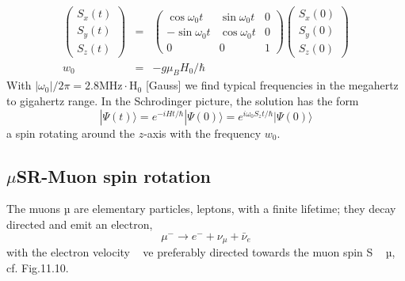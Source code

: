 \begin{equation}
    \begin{array}{ccl}
       \left(\begin{array}{c}{S_{x}(t)} \\ {S_{y}(t)} \\ {S_{z}(t)}\end{array}\right) &=& \left(\begin{array}{ccc}{\cos \omega_{0} t} & {\sin \omega_{0} t} & {0} \\ {-\sin \omega_{0} t} & {\cos \omega_{0} t} & {0} \\ {0} & {0} & {1}\end{array}\right)\left(\begin{array}{c}{S_{x}(0)} \\ {S_{y}(0)} \\ {S_{z}(0)}\end{array}\right)\\
        w_0 &=& -g\mu_BH_0/\hbar
    \end{array}
\end{equation}
With $\left|\omega_{0}\right| / 2 \pi=2.8 \mathrm{MHz} \cdot \mathrm{H}_{0}$ [Gauss] we find typical frequencies in the megahertz to gigahertz range. In the Schrodinger picture, the solution has the form
\begin{equation}
    |\Psi(t)\rangle= e^{-i H t / \hbar}|\Psi(0)\rangle= e^{i \omega_{0} S_{z} t / \hbar}|\Psi(0)\rangle
    \end{equation}
a spin rotating around the $z$-axis with the frequency $w_0$.
\subsection{$\mu$SR-Muon spin rotation}
The muons µ are elementary particles, leptons, with a finite lifetime; they decay directed and emit an electron,
\begin{equation}
    \mu^{-} \rightarrow e^{-}+\nu_{\mu}+\bar{\nu}_{e}
    \end{equation}
with the electron velocity ~ ve preferably directed towards the muon spin S ~ µ, cf. Fig.11.10.

